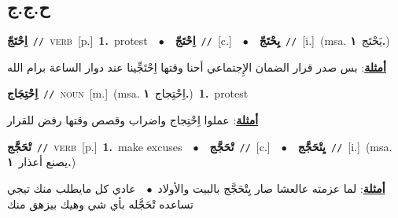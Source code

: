 \documentclass[10pt,a4paper,twoside]{article} %
\begin{document}
\begin{multicols}{2}
\vspace{-3mm}
\subsection*{\color{blue}\foreignlanguage{arabic}{ح.ج.ج}\color{blue}{}} 

{\setlength\topsep{0pt}\textbf{\foreignlanguage{arabic}{اِحْتَجّ}}\ {\color{gray}\texttt{//}\color{black}}\ \textsc{verb}\ [p.]\ \textbf{1.}~protest\ \ $\bullet$\ \ \setlength\topsep{0pt}\textbf{\foreignlanguage{arabic}{اِحْتَجّ}}\ {\color{gray}\texttt{//}\color{black}}\ [c.]\ \ $\bullet$\ \ \setlength\topsep{0pt}\textbf{\foreignlanguage{arabic}{يِحْتَجّ}}\ {\color{gray}\texttt{//}\color{black}}\ [i.]\ \color{gray}(msa. \foreignlanguage{arabic}{يَحْتَج}~\foreignlanguage{arabic}{\textbf{١.}})\color{black}\  \begin{flushright}\color{gray}\foreignlanguage{arabic}{\textbf{\underline{\foreignlanguage{arabic}{أمثلة}}}: بس صدر قرار الضمان الإِجتماعي أحنا وقتها اِحْتَجِّينا عند دوار الساعة برام الله}\end{flushright}\color{black}} \vspace{2mm}

{\setlength\topsep{0pt}\textbf{\foreignlanguage{arabic}{اِحْتِجَاج}}\ {\color{gray}\texttt{//}\color{black}}\ \textsc{noun}\ [m.]\ \color{gray}(msa. \foreignlanguage{arabic}{اِحْتِجاج}~\foreignlanguage{arabic}{\textbf{١.}})\color{black}\ \textbf{1.}~protest\  \begin{flushright}\color{gray}\foreignlanguage{arabic}{\textbf{\underline{\foreignlanguage{arabic}{أمثلة}}}: عملوا اِحْتِجاج واضراب وقصص وقتها رفض للقرار}\end{flushright}\color{black}} \vspace{2mm}

{\setlength\topsep{0pt}\textbf{\foreignlanguage{arabic}{تْحَجَّج}}\ {\color{gray}\texttt{//}\color{black}}\ \textsc{verb}\ [p.]\ \textbf{1.}~make excuses\ \ $\bullet$\ \ \setlength\topsep{0pt}\textbf{\foreignlanguage{arabic}{تْحَجَّج}}\ {\color{gray}\texttt{//}\color{black}}\ [c.]\ \ $\bullet$\ \ \setlength\topsep{0pt}\textbf{\foreignlanguage{arabic}{يِتْحَجَّج}}\ {\color{gray}\texttt{//}\color{black}}\ [i.]\ \color{gray}(msa. \foreignlanguage{arabic}{يصنع أعذار}~\foreignlanguage{arabic}{\textbf{١.}})\color{black}\  \begin{flushright}\color{gray}\foreignlanguage{arabic}{\textbf{\underline{\foreignlanguage{arabic}{أمثلة}}}: لما عزمته عالعشا صار يِتْحَجَّج بالبيت والأولاد\ $\bullet$\ \  عادي كل مايطلب منك تيجي تساعده تْحَجَّله بأي شي وهيك بيزهق منك}\end{flushright}\color{black}} \vspace{2mm}


\end{multicols}
\end{document}
